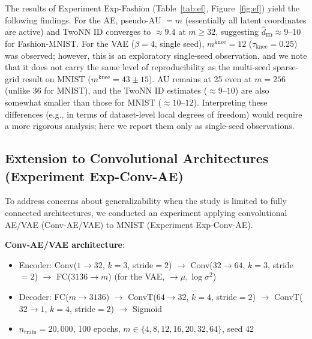\documentclass[make,article,submit,pdftex,moreauthors]{Definitions/mdpi}
\newcommand{\mknee}{m^{\mathrm{knee}}}
\begin{document}
The results of Experiment Exp-Fashion (Table~\ref{tab:ef}, Figure~\ref{fig:ef}) yield the following findings.
For the AE, pseudo-AU $= m$ (essentially all latent coordinates are active) and TwoNN ID converges to
$\approx 9.4$ at $m \geq 32$, suggesting $\hat{d}_\mathrm{ID} \approx 9$--$10$ for Fashion-MNIST.
For the VAE ($\beta=4$, single seed), $\mknee = 12$ ($\tau_{\mathrm{knee}} = 0.25$) was observed;
however, this is an exploratory single-seed observation, and we note that it does not carry the
same level of reproducibility as the multi-seed sparse-grid result on MNIST ($\mknee = 43 \pm 15$).
AU remains at 25 even at $m = 256$ (unlike 36 for MNIST), and the TwoNN ID estimates
($\approx 9$--$10$) are also somewhat smaller than those for MNIST ($\approx 10$--$12$).
Interpreting these differences (e.g., in terms of dataset-level local degrees of freedom)
would require a more rigorous analysis; here we report them only as single-seed observations.

\subsection{Extension to Convolutional Architectures (Experiment Exp-Conv-AE)}\label{sec:exp_conv}

To address concerns about generalizability when the study is limited to fully connected architectures,
we conducted an experiment applying convolutional AE/VAE (Conv-AE/VAE) to MNIST (Experiment Exp-Conv-AE).

\textbf{Conv-AE/VAE architecture}:
\begin{itemize}
  \item Encoder: Conv($1\to32$, $k=3$, stride$=2$) $\to$ Conv($32\to64$, $k=3$, stride$=2$)
        $\to$ FC($3136\to m$) (for the VAE, $\to \mu, \log\sigma^2$)
  \item Decoder: FC($m\to3136$) $\to$ ConvT($64\to32$, $k=4$, stride$=2$) $\to$
        ConvT($32\to1$, $k=4$, stride$=2$) $\to$ Sigmoid
  \item $n_{\mathrm{train}} = 20{,}000$, 100 epochs, $m \in \{4, 8, 12, 16, 20, 32, 64\}$, seed 42
\end{itemize}
\end{document}
